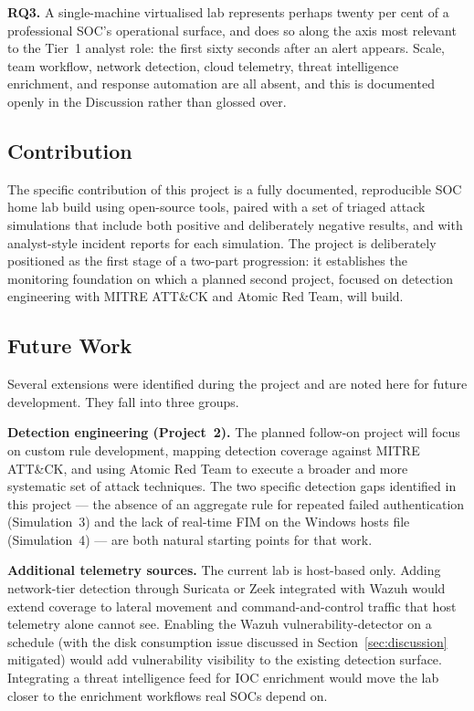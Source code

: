 \textbf{RQ3.} A single-machine virtualised lab represents perhaps twenty
per cent of a professional SOC's operational surface, and does so along
the axis most relevant to the Tier~1 analyst role: the first sixty
seconds after an alert appears. Scale, team workflow, network detection,
cloud telemetry, threat intelligence enrichment, and response automation
are all absent, and this is documented openly in the Discussion rather
than glossed over.

\subsection{Contribution}

The specific contribution of this project is a fully documented,
reproducible SOC home lab build using open-source tools, paired with a
set of triaged attack simulations that include both positive and
deliberately negative results, and with analyst-style incident reports
for each simulation. The project is deliberately positioned as the first
stage of a two-part progression: it establishes the monitoring foundation
on which a planned second project, focused on detection engineering with
MITRE ATT\&CK and Atomic Red Team, will build.

\subsection{Future Work}

Several extensions were identified during the project and are noted here
for future development. They fall into three groups.

\textbf{Detection engineering (Project~2).} The planned follow-on project
will focus on custom rule development, mapping detection coverage against
MITRE ATT\&CK, and using Atomic Red Team to execute a broader and more
systematic set of attack techniques. The two specific detection gaps
identified in this project --- the absence of an aggregate rule for
repeated failed authentication (Simulation~3) and the lack of real-time
FIM on the Windows hosts file (Simulation~4) --- are both natural starting
points for that work.

\textbf{Additional telemetry sources.} The current lab is host-based only.
Adding network-tier detection through Suricata or Zeek integrated with
Wazuh would extend coverage to lateral movement and command-and-control
traffic that host telemetry alone cannot see. Enabling the Wazuh
vulnerability-detector on a schedule (with the disk consumption issue
discussed in Section~\ref{sec:discussion} mitigated) would add
vulnerability visibility to the existing detection surface. Integrating a
threat intelligence feed for IOC enrichment would move the lab closer to
the enrichment workflows real SOCs depend on.

